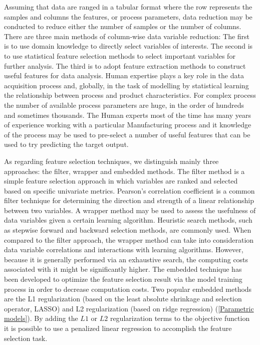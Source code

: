 
Assuming that data are ranged in a tabular format where the row represents the samples and columns the features, or process parameters, data reduction may be conducted to reduce either the number of samples or the number of columns.
There are three main methods of column-wise data variable reduction: The first is to use domain knowledge to directly select variables of interests. The second is to use statistical feature selection methods to select important variables for further analysis. The third is to adopt feature extraction methods to construct useful features for data analysis.
Human expertise plays a key role in the data acquisition process and, globally, in the task of modelling by statistical learning the relationship between process and product characteristics. For complex process the number of available process parameters are huge, in the order of hundreds and sometimes thousands. The Human experts most of the time has many years of experience working with a particular Manufacturing process and it knowledge of the process may be used to pre-select a number of useful features that can be used to try predicting the target output. 

As regarding feature selection techniques, we distinguish mainly three approaches: the filter, wrapper and embedded methods. The filter method is a simple feature selection approach in which variables are ranked and selected based on specific univariate metrics. Pearson's correlation coefficient is a common filter technique for determining the direction and strength of a linear relationship between two variables. A wrapper method may be used to assess the usefulness of data variables given a certain learning algorithm. Heuristic search methods, such as stepwise forward and backward selection methods, are commonly used. When compared to the filter approach, the wrapper method can take into consideration data variable correlations and interactions with learning algorithms. However, because it is generally performed via an exhaustive search, the computing costs associated with it might be significantly higher. The embedded technique has been developed to optimize the feature selection result via the model training process in order to decrease computation costs. Two popular embedded methods are the L1 regularization (based on the least absolute shrinkage and selection operator, LASSO) and L2 regularization (based on ridge regression) (\ref{Parametric models}). By adding the $L1$ or $L2$ regularization terms to the objective function it is possible to use a penalized linear regression to accomplish the feature selection task.

